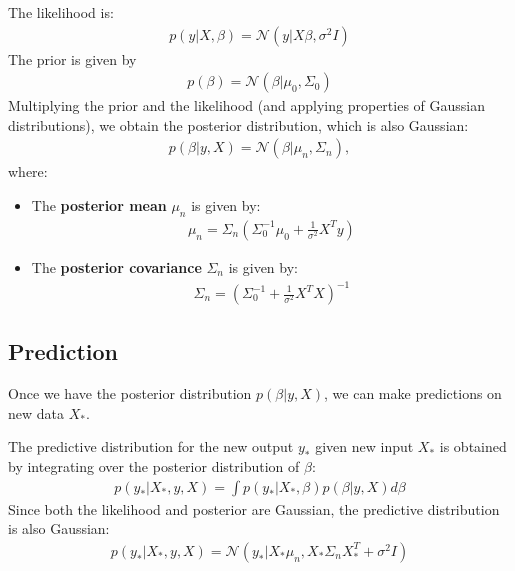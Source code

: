 The likelihood is:
\begin{align*}
	p(y | X, \beta) = \mathcal{N}(y | X\beta, \sigma^2 I)
\end{align*}
The prior is given by
\begin{align*}
	p(\beta) = \mathcal{N}(\beta | \mu_0, \Sigma_0)
\end{align*}
Multiplying the prior and the likelihood (and applying properties of Gaussian distributions), we obtain the posterior distribution, which is also Gaussian:
\begin{align*}
	p(\beta | y, X) = \mathcal{N}(\beta | \mu_n, \Sigma_n),
\end{align*}
where:
\begin{itemize}
    \item The \textbf{posterior mean} $\mu_n$ is given by:
		\begin{align*}
			\mu_n = \Sigma_n \left( \Sigma_0^{-1} \mu_0 + \frac{1}{\sigma^2} X^T y \right)
		\end{align*}
    \item The \textbf{posterior covariance} $\Sigma_n$ is given by:
		\begin{align*}
			\Sigma_n = \left( \Sigma_0^{-1} + \frac{1}{\sigma^2} X^T X \right)^{-1}
		\end{align*}
\end{itemize}



\subsection{Prediction}
Once we have the posterior distribution $ p(\beta | y, X) $, we can make predictions on new data $ X_*$.

The predictive distribution for the new output $ y_* $ given new input $ X_* $ is obtained by integrating over the posterior distribution of $\beta$:
\begin{align*}
	p(y_* | X_*, y, X) = \int p(y_* | X_*, \beta) p(\beta | y, X) d\beta
\end{align*}
Since both the likelihood and posterior are Gaussian, the predictive distribution is also Gaussian:
\begin{align*}
	p(y_* | X_*, y, X) = \mathcal{N}(y_* | X_*\mu_n, X_*\Sigma_n X_*^T + \sigma^2 I)
\end{align*}

